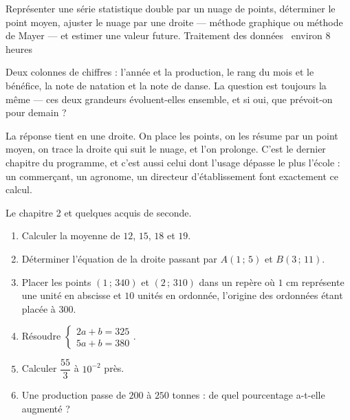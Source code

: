   {Représenter une série statistique double par un nuage de points,
   déterminer le point moyen, ajuster le nuage par une droite — méthode
   graphique ou méthode de Mayer — et estimer une valeur future.}
  {Traitement des données \textbullet\ environ 8 heures}

Deux colonnes de chiffres : l'année et la production, le rang du mois et le
bénéfice, la note de natation et la note de danse. La question est toujours
la même — ces deux grandeurs évoluent-elles ensemble, et si oui, que
prévoit-on pour demain ?

La réponse tient en une droite. On place les points, on les résume par un
point moyen, on trace la droite qui suit le nuage, et l'on prolonge. C'est
le dernier chapitre du programme, et c'est aussi celui dont l'usage dépasse
le plus l'école : un commerçant, un agronome, un directeur d'établissement
font exactement ce calcul.

\begin{revision}
Le chapitre 2 et quelques acquis de seconde.

\begin{enumerate}[label=\textbf{\arabic*.}, leftmargin=*, itemsep=0.35em]
  \item Calculer la moyenne de $12$, $15$, $18$ et $19$.
  \item Déterminer l'équation de la droite passant par $A(1\,;\,5)$ et
        $B(3\,;\,11)$.
  \item Placer les points $(1\,;\,340)$ et $(2\,;\,310)$ dans un repère où
        $1$ cm représente une unité en abscisse et $10$ unités en ordonnée,
        l'origine des ordonnées étant placée à $300$.
  \item Résoudre $\begin{cases} 2a+b = 325\\ 5a+b = 380\end{cases}$.
  \item Calculer $\dfrac{55}{3}$ à $10^{-2}$ près.
  \item Une production passe de $200$ à $250$ tonnes : de quel pourcentage
        a-t-elle augmenté ?
\end{enumerate}
\end{revision}

